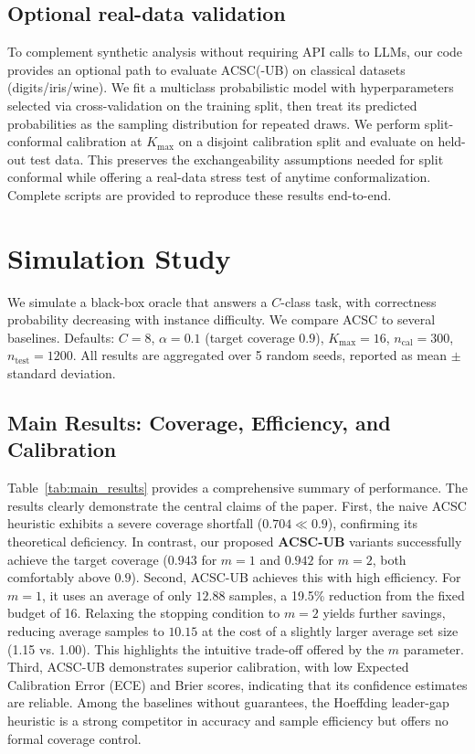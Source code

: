 \documentclass[11pt]{article}
\begin{document}
\subsection{Optional real-data validation}
To complement synthetic analysis without requiring API calls to LLMs, our code provides an optional path to evaluate ACSC(-UB) on classical datasets (digits/iris/wine). We fit a multiclass probabilistic model with hyperparameters selected via cross-validation on the training split, then treat its predicted probabilities as the sampling distribution for repeated draws. We perform split-conformal calibration at $K_{\max}$ on a disjoint calibration split and evaluate on held-out test data. This preserves the exchangeability assumptions needed for split conformal while offering a real-data stress test of anytime conformalization. Complete scripts are provided to reproduce these results end-to-end.

\section{Simulation Study}
\label{sec:sim_study}
We simulate a black-box oracle that answers a $C$-class task, with correctness probability decreasing with instance difficulty. We compare ACSC to several baselines. Defaults: $C=8$, $\alpha=0.1$ (target coverage $0.9$), $K_{\max}=16$, $n_{\mathrm{cal}}=300$, $n_{\mathrm{test}}=1200$. All results are aggregated over 5 random seeds, reported as mean $\pm$ standard deviation.

\subsection{Main Results: Coverage, Efficiency, and Calibration}
Table~\ref{tab:main_results} provides a comprehensive summary of performance. The results clearly demonstrate the central claims of the paper.
First, the naive ACSC heuristic exhibits a severe coverage shortfall ($0.704 \ll 0.9$), confirming its theoretical deficiency. In contrast, our proposed \textbf{ACSC-UB} variants successfully achieve the target coverage ($0.943$ for $m=1$ and $0.942$ for $m=2$, both comfortably above $0.9$).
Second, ACSC-UB achieves this with high efficiency. For $m=1$, it uses an average of only $12.88$ samples, a 19.5\% reduction from the fixed budget of 16. Relaxing the stopping condition to $m=2$ yields further savings, reducing average samples to $10.15$ at the cost of a slightly larger average set size (1.15 vs. 1.00). This highlights the intuitive trade-off offered by the $m$ parameter.
Third, ACSC-UB demonstrates superior calibration, with low Expected Calibration Error (ECE) and Brier scores, indicating that its confidence estimates are reliable.
Among the baselines without guarantees, the Hoeffding leader-gap heuristic is a strong competitor in accuracy and sample efficiency but offers no formal coverage control.
\end{document}
